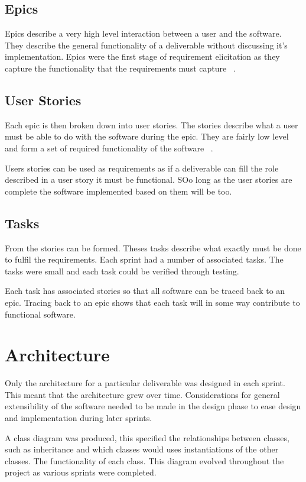 \documentclass{UoYCSproject}
\begin{document}
\subsection{Epics}
Epics describe a very high level interaction between a user and the software. They describe the general functionality of a deliverable without discussing it's implementation. Epics were the first stage of requirement elicitation as they capture the functionality that the requirements must capture ~\parencite{cohn2004user}.
\subsection{User Stories}
Each epic is then broken down into user stories. The stories describe what a user must be able to do with the software during the epic. They are fairly low level and form a set of required functionality of the software ~\parencite{cohn2004user}.

Users stories can be used as requirements as if a deliverable can fill the role described in a user story it must be functional. SOo long as the user stories are complete the software implemented based on them will be too.

\subsection{Tasks}
From the stories can be formed. Theses tasks describe what exactly must be done to fulfil the requirements. Each sprint had a number of associated tasks. The tasks were small and each task could be verified through testing. 

Each task has associated stories so that all software can be traced back to an epic. Tracing back to an epic shows that each task will in some way contribute to functional software.
\section{Architecture}
Only the architecture for a particular deliverable was designed in each sprint. This meant that the architecture grew over time. Considerations for general extensibility of the software needed to be made in the design phase to ease design and implementation during later sprints.

A class diagram was produced, this specified the relationships between classes, such as inheritance and which classes would uses instantiations of the other classes.  The functionality of each class. This diagram evolved throughout the project as various sprints were completed.
\end{document}
